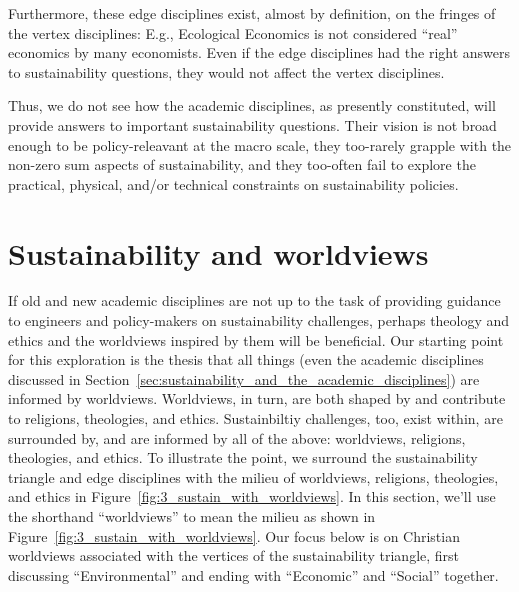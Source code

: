 \documentclass[12pt]{article}
\begin{document}
Furthermore, these edge disciplines exist, almost by definition, 
on the fringes of the vertex disciplines:
E.g., Ecological Economics is not considered ``real'' economics by many economists.
Even if the edge disciplines had the right answers to sustainability questions, 
they would not affect the vertex disciplines. 

Thus, we do not see how the academic disciplines, as presently constituted,
will provide answers to important sustainability questions.
Their vision is not broad enough to be policy-releavant at the macro scale, 
they too-rarely grapple with the non-zero sum aspects of sustainability, and
they too-often fail to explore the practical, physical, and/or technical
constraints on sustainability policies. 


\section{Sustainability and worldviews}
\label{sec:worldviews}

If old and new academic disciplines are not up to the task 
of providing guidance to engineers and policy-makers
on sustainability challenges, 
perhaps theology and ethics and the worldviews inspired by them
will be beneficial.
Our starting point for this exploration is the thesis that 
all things (even the academic disciplines discussed 
in Section~\ref{sec:sustainability_and_the_academic_disciplines})
are informed by worldviews.
Worldviews, in turn, are both shaped by and contribute to religions, theologies, and ethics.
Sustainbiltiy challenges, too, exist within, are surrounded by, and are informed by 
all of the above:
worldviews, religions, theologies, and ethics.
To illustrate the point, we surround the sustainability triangle and edge disciplines with the 
milieu of worldviews, religions, theologies, and ethics in Figure~\ref{fig:3_sustain_with_worldviews}.
In this section, we'll use the shorthand ``worldviews'' to mean the milieu 
as shown in Figure~\ref{fig:3_sustain_with_worldviews}.
Our focus below is on Christian worldviews 
associated with the vertices of the sustainability triangle, 
first discussing ``Environmental'' and ending with 
``Economic'' and ``Social'' together.
\end{document}
